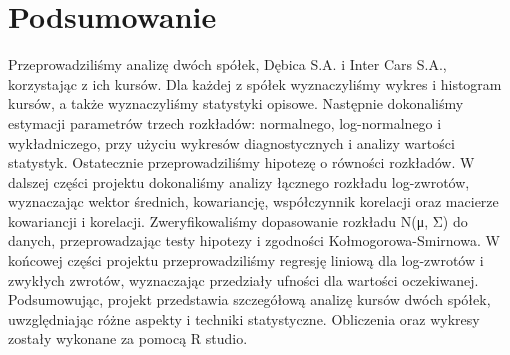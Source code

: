 \documentclass[a4paper,11pt]{article}
\begin{document}
\section{Podsumowanie}
Przeprowadziliśmy analizę dwóch spółek, Dębica S.A. i Inter Cars S.A., korzystając z ich kursów. Dla każdej z spółek wyznaczyliśmy wykres i histogram kursów, a także wyznaczyliśmy statystyki opisowe. Następnie dokonaliśmy estymacji parametrów trzech rozkładów: normalnego, log-normalnego i wykładniczego, przy użyciu wykresów diagnostycznych i analizy wartości statystyk. Ostatecznie przeprowadziliśmy hipotezę o równości rozkładów. W dalszej części projektu dokonaliśmy analizy łącznego rozkładu log-zwrotów, wyznaczając wektor średnich, kowariancję, współczynnik korelacji oraz macierze kowariancji i korelacji. Zweryfikowaliśmy dopasowanie rozkładu N(μ, Σ) do danych, przeprowadzając testy hipotezy i zgodności Kołmogorowa-Smirnowa. W końcowej części projektu przeprowadziliśmy regresję liniową dla log-zwrotów i zwykłych zwrotów, wyznaczając przedziały ufności dla wartości oczekiwanej. Podsumowując, projekt przedstawia szczegółową analizę kursów dwóch spółek, uwzględniając różne aspekty i techniki statystyczne. Obliczenia oraz wykresy zostały wykonane za pomocą R studio.
\end{document}
